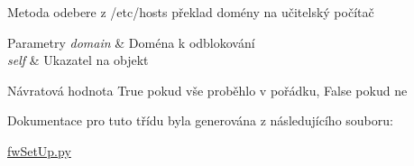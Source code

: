 Metoda odebere z /etc/hosts překlad domény na učitelský počítač 


\begin{DoxyParams}{Parametry}
{\em domain} & Doména k odblokování \\
\hline
{\em self} & Ukazatel na objekt \\
\hline
\end{DoxyParams}
\begin{DoxyReturn}{Návratová hodnota}
True pokud vše proběhlo v pořádku, False pokud ne 
\end{DoxyReturn}


Dokumentace pro tuto třídu byla generována z následujícího souboru\-:\begin{DoxyCompactItemize}
\item 
\hyperlink{fwSetUp_8py}{fw\-Set\-Up.\-py}\end{DoxyCompactItemize}
